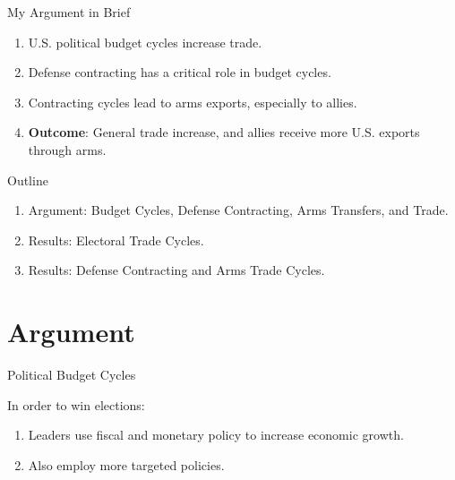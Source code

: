 \documentclass[12pt]{beamer}
\begin{document}

\begin{frame}{My Argument in Brief}

\begin{enumerate}
\item U.S. political budget cycles increase trade.  
\pause 
\item Defense contracting has a critical role in budget cycles.
\pause 
\item Contracting cycles lead to arms exports, especially to allies. 
\pause
\item \textbf{Outcome}: General trade increase, and allies receive more U.S. exports through arms. 
\end{enumerate}

\end{frame}



\begin{frame}{Outline}

\pause
\begin{enumerate}
\item Argument: Budget Cycles, Defense Contracting, Arms Transfers, and Trade. 
\pause
\item Results: Electoral Trade Cycles. 
\pause
\item Results: Defense Contracting and Arms Trade Cycles.  
\end{enumerate}


\end{frame}
 


\section{Argument} 


\begin{frame}{Political Budget Cycles}

In order to win elections:
\pause 
\begin{enumerate} 
\item Leaders use fiscal and monetary policy to increase economic growth. 
\pause 
\item Also employ more targeted policies.
\end{enumerate}


\end{frame} 
\end{document}
